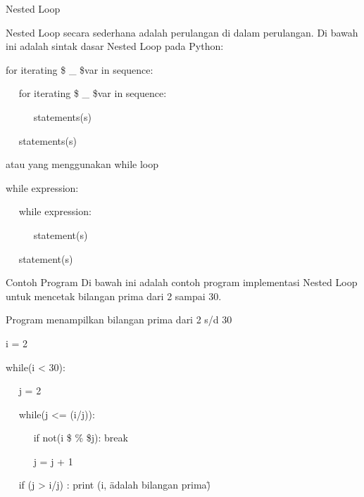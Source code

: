 \vspace{12pt}
\vspace{\baselineskip}
\vspace{12pt}
Nested Loop \par
\vspace{\baselineskip}
Nested Loop secara sederhana adalah perulangan di dalam perulangan.\vspace{\baselineskip}
\vspace{\baselineskip}
Di bawah ini adalah sintak dasar Nested Loop pada Python:\vspace{\baselineskip}
\vspace{\baselineskip}
 \par
for iterating \$  \_  \$var in sequence: \par
~~ for iterating \$  \_  \$var in sequence: \par
~~~~~ statements(s) \par
~~ statements(s) \par
\vspace{\baselineskip}
atau yang menggunakan while loop\vspace{\baselineskip}
\vspace{\baselineskip}
 \par
while expression: \par
~~ while expression: \par
~~~~~ statement(s) \par
~~ statement(s) \par
\vspace{\baselineskip}
Contoh Program\vspace{\baselineskip}
\vspace{\baselineskip}
Di bawah ini adalah contoh program implementasi Nested Loop untuk mencetak bilangan prima dari 2 sampai 30.\vspace{\baselineskip}
\vspace{\baselineskip}
 \par
Program menampilkan bilangan prima dari 2 s/d 30 \par
\vspace{12pt}
i = 2 \par
while(i < 30): \par
~~ j = 2 \par
~~ while(j <= (i/j)): \par
~~~~~ if not(i \$  \%  \$j): break \par
~~~~~ j = j + 1 \par
~~ if (j > i/j) : print (i, \" adalah bilangan prima\") \par
